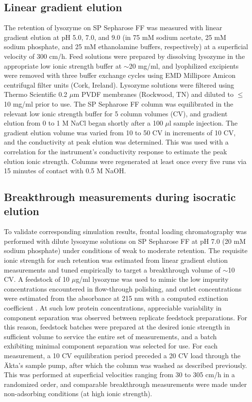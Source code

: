 \documentclass[preprint,review,12pt]{elsarticle}
\begin{document}
    \subsection{Linear gradient elution} \label{ssec:lge}
        The retention of lysozyme on SP Sepharose FF was measured with linear gradient elution at pH 5.0, 7.0, and 9.0 (in 75 mM sodium acetate, 25 mM sodium phosphate, and 25 mM ethanolamine buffers, respectively) at a superficial velocity of 300 cm/h. Feed solutions were prepared by dissolving lysozyme in the appropriate low ionic strength buffer at $\sim$20 mg/ml, and lyophilized excipients were removed with three buffer exchange cycles using EMD Millipore Amicon centrifugal filter units (Cork, Ireland). Lysozyme solutions were filtered using Thermo Scientific 0.2 $\mu$m PVDF membranes (Rockwood, TN) and diluted to $\leq$ 10 mg/ml prior to use. The SP Sepharose FF column was equilibrated in the relevant low ionic strength buffer for 5 column volumes (CV), and gradient elution from 0 to 1 M NaCl began shortly after a 100 $\mu$l sample injection. The gradient elution volume was varied from 10 to 50 CV in increments of 10 CV, and the conductivity at peak elution was determined. This was used with a correlation for the instrument's conductivity response to estimate the peak elution ionic strength. Columns were regenerated at least once every five runs via 15 minutes of contact with 0.5 M NaOH.

    \subsection{Breakthrough measurements during isocratic elution} \label{ssec:exp_breakthrough}
        To validate corresponding simulation results, frontal loading chromatography was performed with dilute lysozyme solutions on SP Sepharose FF at pH 7.0 (20 mM sodium phosphate) under conditions of weak to moderate retention. The requisite ionic strength for such retention was estimated from linear gradient elution measurements and tuned empirically to target a breakthrough volume of $\sim$10 CV. A feedstock of 10 $\mu$g/ml lysozyme was used to mimic the low impurity concentrations encountered in flow-through polishing, and outlet concentrations were estimated from the absorbance at 215 nm with a computed extinction coefficient \cite{Kuipers2007}. At such low protein concentrations, appreciable variability in component separation was observed between replicate feedstock preparations. For this reason, feedstock batches were  prepared at the desired ionic strength in sufficient volume to service the entire set of measurements, and a batch exhibiting minimal component separation was selected for use. For each measurement, a 10 CV equilibration period preceded a 20 CV load through the \"{A}kta's sample pump, after which the column was washed as described previously. This was performed at superficial velocities ranging from 30 to 305 cm/h in a randomized order, and comparable breakthrough measurements were made under non-adsorbing conditions (at high ionic strength).
\end{document}
